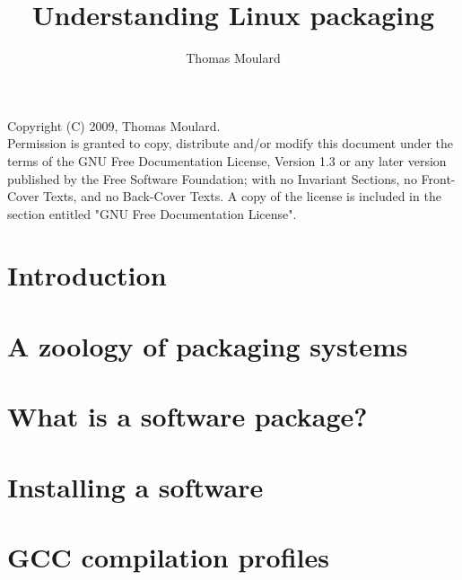 \documentclass[11pt]{article}
\begin{document}
  \title{Understanding Linux packaging}

  \author{Thomas Moulard}
  \maketitle

  \pagestyle{empty} %
  \thispagestyle{empty}


  Copyright (C) 2009, Thomas Moulard.\\
  Permission is granted to copy, distribute and/or modify this document
  under the terms of the GNU Free Documentation License, Version 1.3
  or any later version published by the Free Software Foundation;
  with no Invariant Sections, no Front-Cover Texts, and no Back-Cover Texts.
  A copy of the license is included in the section entitled "GNU
  Free Documentation License".


  \tableofcontents
  \newpage

  \section{Introduction}
  \label{intro}
  

  \section{A zoology of packaging systems}
  \label{zoology}
  

  \section{What is a software package?}
  \label{package}
  

  \section{Installing a software}
  \label{install}
  

  \appendix
  \newpage

  \section{GCC compilation profiles}
  \label{compilation_profiles}
  

%  
\end{document}
